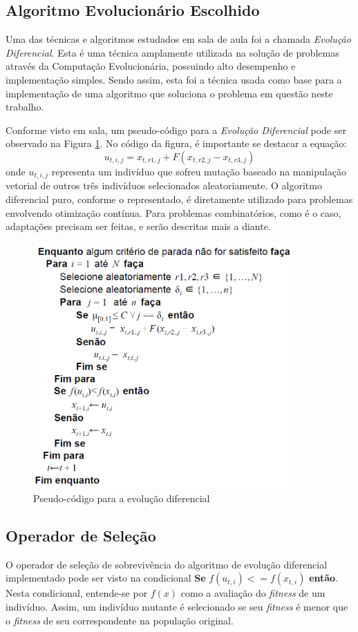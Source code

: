 \documentclass[12pt]{elsarticle}
\begin{document}
	\subsection{Algoritmo Evolucionário Escolhido}
	Uma das técnicas e algoritmos estudados em sala de aula foi a chamada \textit{Evolução Diferencial}. Esta é uma técnica amplamente utilizada na solução de problemas através da Computação Evolucionária, possuindo alto desempenho e implementação simples. Sendo assim, esta foi a técnica usada como base para a implementação de uma algoritmo que soluciona o problema em questão neste trabalho.
	
	Conforme visto em sala, um pseudo-código para a \textit{Evolução Diferencial} pode ser observado na Figura \ref{fig:pseudo-code}. No código da figura, é importante se destacar a equação: 
	\[u_{t,i,j} = x_{t,r1,j}+F(x_{t,r2,j}-x_{t,r3,j})\]
	onde $u_{t,i,j}$ representa um indivíduo que sofreu mutação baseado na manipulação vetorial de outros três indivíduos selecionados aleatoriamente. O algoritmo diferencial puro, conforme o representado, é diretamente utilizado para problemas envolvendo otimização contínua. Para problemas combinatórios, como é o caso, adaptações precisam ser feitas, e serão descritas mais a diante.
	\begin{figure}[h]
		\centering
		\includegraphics[width=10cm]{img/pseudo-code.png}
		\caption{Pseudo-código para a evolução diferencial}
		\label{fig:pseudo-code}
	\end{figure}
	\pagebreak
	
	\subsection{Operador de Seleção}
	O operador de seleção de sobrevivência do algoritmo de evolução diferencial implementado pode ser visto na condicional \textbf{Se} $f(u_{t,i})<=f(x_{t,i})$ \textbf{então}. Nesta condicional, entende-se por $f(x)$ como a avaliação do \textit{fitness} de um indivíduo. Assim, um indivíduo mutante é selecionado se seu \textit{fitness} é menor que o \textit{fitness} de seu correspondente na população original.
	
\end{document}
